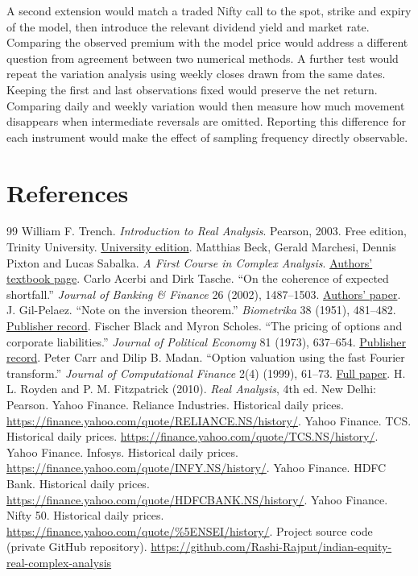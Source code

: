 \documentclass[12pt,a4paper]{article}
\newcommand{\chapterpage}[1]{\clearpage\section{#1}}
\begin{document}
A second extension would match a traded Nifty call to the spot, strike and expiry of the model, then introduce the relevant dividend yield and market rate. Comparing the observed premium with the model price would address a different question from agreement between two numerical methods.
A further test would repeat the variation analysis using weekly closes drawn from the same dates. Keeping the first and last observations fixed would preserve the net return. Comparing daily and weekly variation would then measure how much movement disappears when intermediate reversals are omitted. Reporting this difference for each instrument would make the effect of sampling frequency directly observable.
\chapterpage{References}
\begingroup
\renewcommand{\section}[2]{}
\begin{thebibliography}{99}
 William F. Trench. \textit{Introduction to Real Analysis}. Pearson, 2003. Free edition, Trinity University. \href{https://ramanujan.math.trinity.edu/wtrench/texts/trench_real_analysis.pdf}{University edition}.
 Matthias Beck, Gerald Marchesi, Dennis Pixton and Lucas Sabalka. \textit{A First Course in Complex Analysis}. \href{https://matthbeck.github.io/complex.html}{Authors' textbook page}.
 Carlo Acerbi and Dirk Tasche. ``On the coherence of expected shortfall.'' \textit{Journal of Banking \& Finance} 26 (2002), 1487--1503. \href{https://arxiv.org/abs/cond-mat/0104295}{Authors' paper}.
 J. Gil-Pelaez. ``Note on the inversion theorem.'' \textit{Biometrika} 38 (1951), 481--482. \href{https://doi.org/10.1093/biomet/38.3-4.481}{Publisher record}.
 Fischer Black and Myron Scholes. ``The pricing of options and corporate liabilities.'' \textit{Journal of Political Economy} 81 (1973), 637--654. \href{https://doi.org/10.1086/260062}{Publisher record}.
 Peter Carr and Dilip B. Madan. ``Option valuation using the fast Fourier transform.'' \textit{Journal of Computational Finance} 2(4) (1999), 61--73. \href{https://wwwf.imperial.ac.uk/~ajacquie/IC_Num_Methods/IC_Num_Methods_Docs/Literature/CarrMadan.pdf}{Full paper}.
 H. L. Royden and P. M. Fitzpatrick (2010). \textit{Real Analysis}, 4th ed. New Delhi: Pearson.
 Yahoo Finance. Reliance Industries. Historical daily prices. \url{https://finance.yahoo.com/quote/RELIANCE.NS/history/}.
 Yahoo Finance. TCS. Historical daily prices. \url{https://finance.yahoo.com/quote/TCS.NS/history/}.
 Yahoo Finance. Infosys. Historical daily prices. \url{https://finance.yahoo.com/quote/INFY.NS/history/}.
 Yahoo Finance. HDFC Bank. Historical daily prices. \url{https://finance.yahoo.com/quote/HDFCBANK.NS/history/}.
 Yahoo Finance. Nifty 50. Historical daily prices. \url{https://finance.yahoo.com/quote/%5ENSEI/history/}.
 Project source code (private GitHub repository). \url{https://github.com/Rashi-Rajput/indian-equity-real-complex-analysis}
\end{thebibliography}\endgroup
\end{document}
